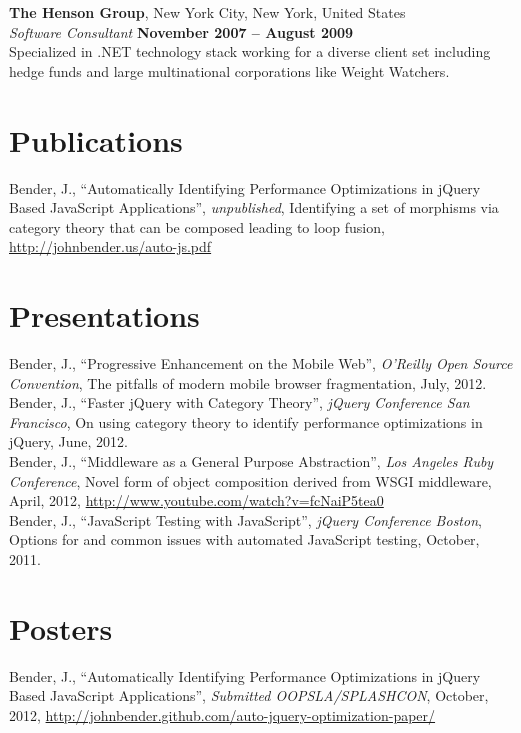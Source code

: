 \documentclass[margin,line]{resume}
\begin{document}
\begin{resume}
  \textbf{The Henson Group}, New York City, New York, United States \vspace{1mm}\\
  \textsl{Software Consultant} \hfill \textbf{November 2007 -- August 2009}\\
  Specialized in .NET technology stack working for a diverse client set including hedge funds and large multinational corporations like Weight Watchers.

  \section{\mysidestyle Publications}
  Bender, J., ``Automatically Identifying Performance Optimizations in jQuery Based JavaScript Applications'', \textsl{unpublished}, Identifying a set of morphisms via category theory that can be composed leading to loop fusion, \url{http://johnbender.us/auto-js.pdf}

  \section{\mysidestyle Presentations}
  Bender, J., ``Progressive Enhancement on the Mobile Web'', \textsl{O'Reilly Open Source Convention}, The pitfalls of modern mobile browser fragmentation, July, 2012.\vspace{2mm}\\
  Bender, J., ``Faster jQuery with Category Theory'', \textsl{jQuery Conference San Francisco}, On using category theory to identify performance optimizations in jQuery, June, 2012. \vspace{2mm}\\
  Bender, J., ``Middleware as a General Purpose Abstraction'', \textsl{Los Angeles Ruby Conference}, Novel form of object composition derived from WSGI middleware, April, 2012, \url{http://www.youtube.com/watch?v=fcNaiP5tea0} \vspace{2mm}\\
  Bender, J., ``JavaScript Testing with JavaScript'', \textsl{jQuery Conference Boston}, Options for and common issues with automated JavaScript testing, October, 2011.

  \section{\mysidestyle Posters}
  Bender, J., ``Automatically Identifying Performance Optimizations in jQuery Based JavaScript Applications'', \textsl{Submitted OOPSLA/SPLASHCON}, October, 2012, \url{http://johnbender.github.com/auto-jquery-optimization-paper/}



\end{resume}
\end{document}
